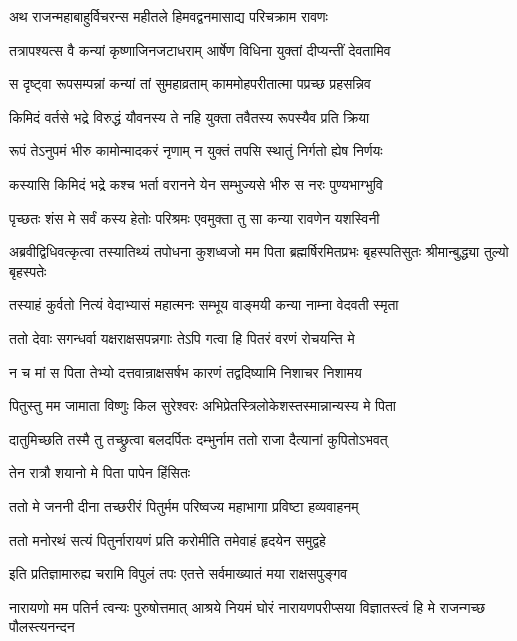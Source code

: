 
\twolineshloka
{अथ राजन्महाबाहुर्विचरन्स महीतले}
{हिमवद्वनमासाद्य परिचक्राम रावणः} %

\twolineshloka
{तत्रापश्यत्स वै कन्यां कृष्णाजिनजटाधराम्}
{आर्षेण विधिना युक्तां दीप्यन्तीं देवतामिव} %

\twolineshloka
{स दृष्ट्वा रूपसम्पन्नां कन्यां तां सुमहाव्रताम्}
{काममोहपरीतात्मा पप्रच्छ प्रहसन्निव} %

\twolineshloka
{किमिदं वर्तसे भद्रे विरुद्धं यौवनस्य ते}
{नहि युक्ता तवैतस्य रूपस्यैव प्रति क्रिया} %

\twolineshloka
{रूपं तेऽनुपमं भीरु कामोन्मादकरं नृणाम्}
{न युक्तं तपसि स्थातुं निर्गतो ह्येष निर्णयः} %

\twolineshloka
{कस्यासि किमिदं भद्रे कश्च भर्ता वरानने}
{येन सम्भुज्यसे भीरु स नरः पुण्यभाग्भुवि} %

\twolineshloka
{पृच्छतः शंस मे सर्वं कस्य हेतोः परिश्रमः}
{एवमुक्ता तु सा कन्या रावणेन यशस्विनी} %

\threelineshloka
{अब्रवीद्विधिवत्कृत्वा तस्यातिथ्यं तपोधना}
{कुशध्वजो मम पिता ब्रह्मर्षिरमितप्रभः}
{बृहस्पतिसुतः श्रीमान्बुद्ध्या तुल्यो बृहस्पतेः} %

\twolineshloka
{तस्याहं कुर्वतो नित्यं वेदाभ्यासं महात्मनः}
{सम्भूय वाङ्मयी कन्या नाम्ना वेदवती स्मृता} %

\twolineshloka
{ततो देवाः सगन्धर्वा यक्षराक्षसपन्नगाः}
{तेऽपि गत्वा हि पितरं वरणं रोचयन्ति मे} %

\twolineshloka
{न च मां स पिता तेभ्यो दत्तवान्राक्षसर्षभ}
{कारणं तद्वदिष्यामि निशाचर निशामय} %

\twolineshloka
{पितुस्तु मम जामाता विष्णुः किल सुरेश्वरः}
{अभिप्रेतस्त्रिलोकेशस्तस्मान्नान्यस्य मे पिता} %

\twolineshloka
{दातुमिच्छति तस्मै तु तच्छ्रुत्वा बलदर्पितः}
{दम्भुर्नाम ततो राजा दैत्यानां कुपितोऽभवत्} %

\onelineshloka
{तेन रात्रौ शयानो मे पिता पापेन हिंसितः} %

\twolineshloka
{ततो मे जननी दीना तच्छरीरं पितुर्मम}
{परिष्वज्य महाभागा प्रविष्टा हव्यवाहनम्} %

\twolineshloka
{ततो मनोरथं सत्यं पितुर्नारायणं प्रति}
{करोमीति तमेवाहं हृदयेन समुद्वहे} %

\twolineshloka
{इति प्रतिज्ञामारुह्य चरामि विपुलं तपः}
{एतत्ते सर्वमाख्यातं मया राक्षसपुङ्गव} %

\threelineshloka
{नारायणो मम पतिर्न त्वन्यः पुरुषोत्तमात्}
{आश्रये नियमं घोरं नारायणपरीप्सया}
{विज्ञातस्त्वं हि मे राजन्गच्छ पौलस्त्यनन्दन} %

